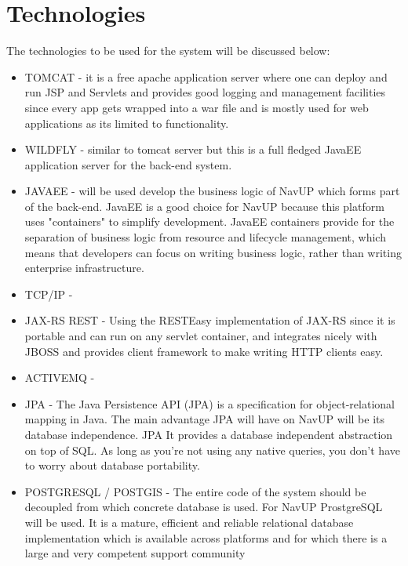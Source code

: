 
\section{Technologies}
The technologies to be used for the system will be discussed below:
\begin{itemize}
	\item TOMCAT - it is a free apache application server where one can deploy and run JSP and Servlets and provides good logging and management facilities since every app gets wrapped into a war file and is mostly used for web applications as its limited to functionality.
	
	\item WILDFLY - similar to tomcat server but this is a full fledged JavaEE application server for the back-end system.
	
	\item JAVAEE - will be used develop the business logic of NavUP which forms part of the back-end. JavaEE is a good choice for NavUP because this platform uses "containers" to simplify development. JavaEE containers provide for the separation of business logic from resource and lifecycle management, which means that developers can focus on writing business logic, rather than writing enterprise infrastructure. 
	
	\item TCP/IP - 
	
	\item JAX-RS REST - Using the RESTEasy implementation of JAX-RS since it is portable and can run on any servlet container, and integrates nicely with JBOSS and provides client framework to make writing HTTP clients easy.
	
	\item ACTIVEMQ - 
	
	\item JPA - The Java Persistence API (JPA) is a specification for object-relational mapping in Java. The main advantage JPA will have on NavUP will be its database independence. JPA It provides a database independent abstraction on top of SQL. As long as you're not using any native queries, you don't have to worry about database portability. 
	
	\item POSTGRESQL / POSTGIS - The entire code of the system should be decoupled from which concrete database is used. For
NavUP ProstgreSQL will be used. It is a mature, efficient and reliable relational database
implementation which is available across platforms and for which there is a large and very competent
support community
	

\end{itemize}
